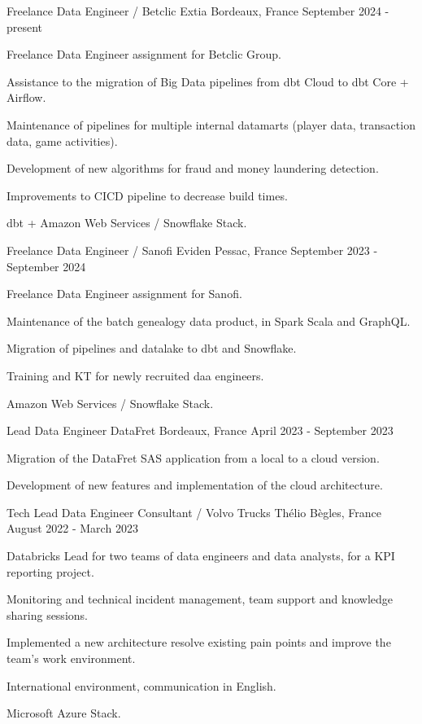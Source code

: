 
\begin{cventries}
	\cventry
	{Freelance Data Engineer / Betclic}
	{Extia}
	{Bordeaux, France}
	{September 2024 - present}
	{
		\begin{cvitems}
			\item {Freelance Data Engineer assignment for Betclic Group.}
			\item {Assistance to the migration of Big Data pipelines from dbt Cloud to dbt Core + Airflow.}
			\item {Maintenance of pipelines for multiple internal datamarts (player data, transaction data, game activities).}
			\item {Development of new algorithms for fraud and money laundering detection.}
			\item {Improvements to CICD pipeline to decrease build times.}
			\item {dbt + Amazon Web Services / Snowflake Stack.}
		\end{cvitems}
	}
	
	\cventry
	{Freelance Data Engineer / Sanofi}
	{Eviden}
	{Pessac, France}
	{September 2023 - September 2024}
	{
		\begin{cvitems}
			\item {Freelance Data Engineer assignment for Sanofi.}
			\item {Maintenance of the batch genealogy data product, in Spark Scala and GraphQL.}
			\item {Migration of pipelines and datalake to dbt and Snowflake.}
			\item {Training and KT for newly recruited daa engineers.}
			\item {Amazon Web Services / Snowflake Stack.}
		\end{cvitems}
	}

	\cventry
	{Lead Data Engineer}
	{DataFret}
	{Bordeaux, France}
	{April 2023 - September 2023}
	{
		\begin{cvitems}
			\item {Migration of the DataFret SAS application from a local to a cloud version.}
			\item {Development of new features and implementation of the cloud architecture.}
		\end{cvitems}
	}
	
	\cventry
	{Tech Lead Data Engineer Consultant / Volvo Trucks}
	{Thélio}
	{Bègles, France}
	{August 2022 - March 2023}
	{
		\begin{cvitems}
			\item {Databricks Lead for two teams of data engineers and data analysts, for a KPI reporting project.}
			\item {Monitoring and technical incident management, team support and knowledge sharing sessions.}
			\item {Implemented a new architecture resolve existing pain points and improve the team's work environment.}
			\item {International environment, communication in English.}
			\item {Microsoft Azure Stack.}
		\end{cvitems}
	}
	

\end{cventries}
